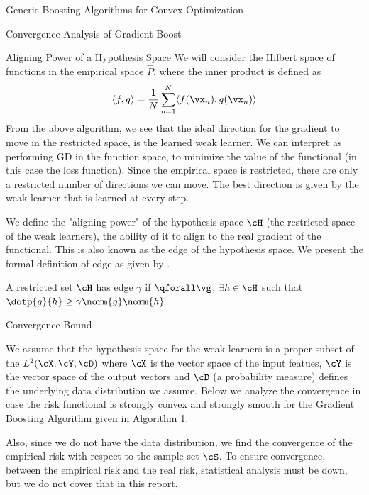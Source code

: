 \documentclass{article}
\begin{document}
\begin{psection}{Generic Boosting Algorithms for Convex Optimization}
\begin{psubsection}{Convergence Analysis of Gradient Boost}
		\begin{pssubsection}{Aligning Power of a Hypothesis Space}
			We will consider the Hilbert space of functions in the empirical space $\hat{P}$, where the inner product is defined as
			\begin{align*}
				\langle f,g\rangle=\frac{1}{N}\sum_{n=1}^N\langle f(\vx_n),g(\vx_n)\rangle
			\end{align*}
			From the above algorithm, we see that the ideal direction for the gradient to move in the restricted space, is the learned weak learner. We can interpret as performing GD in the function space, to minimize the value of the functional (in this case the loss function). Since the empirical space is restricted, there are only a restricted number of directions we can move. The best direction is given by the weak learner that is learned at every step.

			We define the "aligning power" of the hypothesis space $\cH$ (the restricted space of the weak learners), the ability of it to align to the real gradient of the functional. This is also known as the edge of the hypothesis space. We present the formal definition of edge as given by \cite{cvx-boosting}.
			\begin{definition}[Edge]
				A restricted set $\cH$ has edge $\gamma$ if $\qforall \vg$, $\exists h \in \cH$ such that $\dotp{g}{h} \ge \gamma \norm{g} \norm{h}$
			\end{definition}
		\end{pssubsection}

		\begin{pssubsection}{Convergence Bound}

			We assume that the hypothesis space for the weak learners is a proper subset of the $L^2(\cX, \cY, \cD)$ where $\cX$ is the vector space of the input featues, $\cY$ is the vector space of the output vectors and $\cD$ (a probability measure) defines the underlying data distribution we assume. Below we analyze the convergence in case the risk functional is strongly convex and strongly smooth for the Gradient Boosting Algorithm given in \hyperlink{algo:1}{Algorithm 1}.

			Also, since we do not have the data distribution, we find the convergence of the empirical risk with respect to the sample set $\cS$. To ensure convergence, between the empirical risk and the real risk, statistical analysis must be down, but we do not cover that in this report.


\end{pssubsection}
\end{psubsection}
\end{psection}
\end{document}
